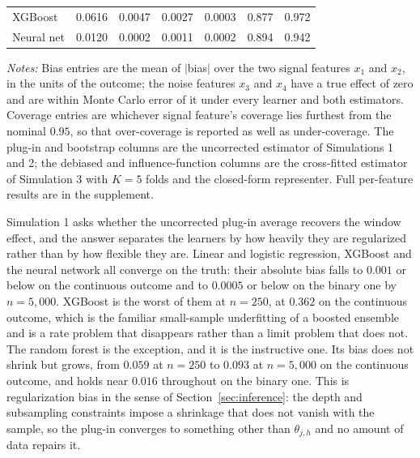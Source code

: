 \documentclass[12pt,a4paper]{article}
\numberwithin{equation}{section}
\theoremstyle{plain}
\theoremstyle{definition}
\begin{document}
\begin{table}[htbp]
\begin{threeparttable}
\begin{tabular}{lrrrrrr}
\quad XGBoost        & 0.0616 & 0.0047 & 0.0027 & 0.0003 & 0.877 & 0.972 \\
\quad Neural net     & 0.0120 & 0.0002 & 0.0011 & 0.0002 & 0.894 & 0.942 \\
\bottomrule
\end{tabular}
\begin{tablenotes}
\footnotesize
\item \textit{Notes:} Bias entries are the mean of $|$bias$|$ over the two
signal features $x_1$ and $x_2$, in the units of the outcome; the noise
features $x_3$ and $x_4$ have a true effect of zero and are within Monte
Carlo error of it under every learner and both estimators. Coverage
entries are whichever signal feature's coverage lies furthest from the
nominal $0.95$, so that over-coverage is reported as well as
under-coverage. The plug-in and bootstrap columns are the uncorrected
estimator of Simulations 1 and 2; the debiased and influence-function
columns are the cross-fitted estimator of Simulation 3 with $K=5$ folds
and the closed-form representer. Full per-feature results are in the supplement.
\end{tablenotes}
\end{threeparttable}
\end{table}

	Simulation 1 asks whether the uncorrected plug-in average recovers the
	window effect, and the answer separates the learners by how heavily they are
	regularized rather than by how flexible they are. Linear and logistic
	regression, XGBoost and the neural network all converge on the truth: their
	absolute bias falls to $0.001$ or below on the continuous outcome and to
	$0.0005$ or below on the binary one by $n=5{,}000$. XGBoost is the worst of
	them at $n=250$, at $0.362$ on the continuous outcome, which is the familiar
	small-sample underfitting of a boosted ensemble and is a rate problem that
	disappears rather than a limit problem that does not. The random forest is
	the exception, and it is the instructive one. Its bias does not shrink but
	grows, from $0.059$ at $n=250$ to $0.093$ at $n=5{,}000$ on the continuous
	outcome, and holds near $0.016$ throughout on the binary one. This is
	regularization bias in the sense of Section~\ref{sec:inference}: the depth
	and subsampling constraints impose a shrinkage that does not vanish with the
	sample, so the plug-in converges to something other than $\theta_{j,h}$ and
	no amount of data repairs it.
\end{document}
